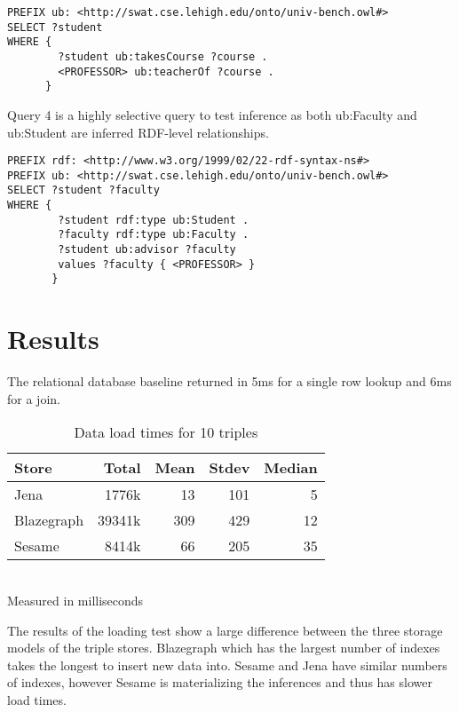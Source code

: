 \documentclass{llncs}
\begin{document}
\begin{lstlisting}[caption=Query 3]
PREFIX ub: <http://swat.cse.lehigh.edu/onto/univ-bench.owl#>
SELECT ?student
WHERE {
        ?student ub:takesCourse ?course .
        <PROFESSOR> ub:teacherOf ?course .
      }
\end{lstlisting}

\smallskip

Query 4 is a highly selective query to test inference as both ub:Faculty and ub:Student are inferred RDF-level relationships.

\begin{lstlisting}[caption=Query 4]
PREFIX rdf: <http://www.w3.org/1999/02/22-rdf-syntax-ns#>
PREFIX ub: <http://swat.cse.lehigh.edu/onto/univ-bench.owl#>
SELECT ?student ?faculty
WHERE {
        ?student rdf:type ub:Student .
        ?faculty rdf:type ub:Faculty .
        ?student ub:advisor ?faculty 
        values ?faculty { <PROFESSOR> }
       }
\end{lstlisting}
\clearpage

\section{Results}
The relational database baseline returned in 5ms for a single row lookup and 6ms for a join.

\begin{table}
\begin{center}
\caption{Data load times for 10 triples}
\begin{tabular}{l | r r r r }
Store & Total & Mean & Stdev & Median \\
\hline
Jena & 1776k & 13 & 101 & 5 \\
Blazegraph & 39341k & 309 & 429 & 12 \\
Sesame & 8414k & 66 & 205 & 35
\end{tabular}
\\[5pt]
Measured in milliseconds
\end{center}
\end{table}
The results of the loading test show a large difference between the three storage models of the triple stores.  Blazegraph which has the largest number of indexes takes the longest to insert new data into. Sesame and Jena have similar numbers of indexes, however Sesame is materializing the inferences and thus has slower load times.
\end{document}
